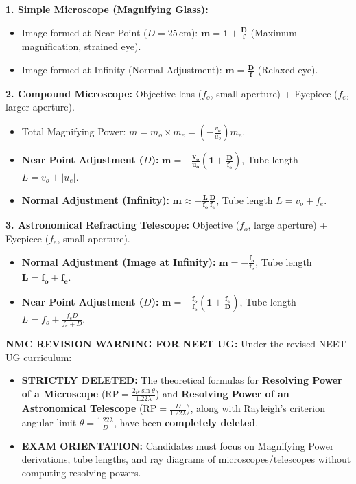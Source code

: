 \documentclass[10pt,twoside,openright]{book}
\begin{document}
\begin{formulabox}
\textbf{1. Simple Microscope (Magnifying Glass):}
\begin{itemize}
  \item Image formed at Near Point ($D = 25\,\mathrm{cm}$): $\mathbf{m = 1 + \frac{D}{f}}$ (Maximum magnification, strained eye).
  \item Image formed at Infinity (Normal Adjustment): $\mathbf{m = \frac{D}{f}}$ (Relaxed eye).
\end{itemize}
\textbf{2. Compound Microscope:}
Objective lens ($f_o$, small aperture) + Eyepiece ($f_e$, larger aperture).
\begin{itemize}
  \item Total Magnifying Power: $m = m_o \times m_e = \left(-\frac{v_o}{u_o}\right) m_e$.
  \item \textbf{Near Point Adjustment ($D$):} $\mathbf{m = -\frac{v_o}{u_o}\left(1 + \frac{D}{f_e}\right)}$, Tube length $L = v_o + |u_e|$.
  \item \textbf{Normal Adjustment (Infinity):} $\mathbf{m \approx -\frac{L}{f_o}\frac{D}{f_e}}$, Tube length $L = v_o + f_e$.
\end{itemize}
\textbf{3. Astronomical Refracting Telescope:}
Objective ($f_o$, large aperture) + Eyepiece ($f_e$, small aperture).
\begin{itemize}
  \item \textbf{Normal Adjustment (Image at Infinity):} $\mathbf{m = -\frac{f_o}{f_e}}$, Tube length $\mathbf{L = f_o + f_e}$.
  \item \textbf{Near Point Adjustment ($D$):} $\mathbf{m = -\frac{f_o}{f_e}\left(1 + \frac{f_e}{D}\right)}$, Tube length $L = f_o + \frac{f_e D}{f_e + D}$.
\end{itemize}
\end{formulabox}

\begin{trapbox}
\textbf{NMC REVISION WARNING FOR NEET UG:}
Under the revised NEET UG curriculum:
\begin{itemize}
  \item \textbf{STRICTLY DELETED:} The theoretical formulas for \textbf{Resolving Power of a Microscope} ($\text{RP} = \frac{2\mu\sin\theta}{1.22\lambda}$) and \textbf{Resolving Power of an Astronomical Telescope} ($\text{RP} = \frac{D}{1.22\lambda}$), along with Rayleigh's criterion angular limit $\theta = \frac{1.22\lambda}{D}$, have been \textbf{completely deleted}.
  \item \textbf{EXAM ORIENTATION:} Candidates must focus on Magnifying Power derivations, tube lengths, and ray diagrams of microscopes/telescopes without computing resolving powers.
\end{itemize}
\end{trapbox}
\end{document}
